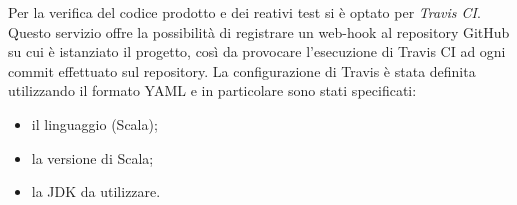 Per la verifica del codice prodotto e dei reativi test si è optato per \textit{Travis CI}.
Questo servizio offre la possibilità di registrare un web-hook al repository GitHub su cui è istanziato il progetto, così da provocare l'esecuzione di Travis CI ad ogni commit effettuato sul repository.
La configurazione di Travis è stata definita utilizzando il formato YAML e in particolare sono stati specificati:
\begin{itemize}
	\item il linguaggio (Scala);
	\item la versione di Scala;
	\item la JDK da utilizzare.
\end{itemize}